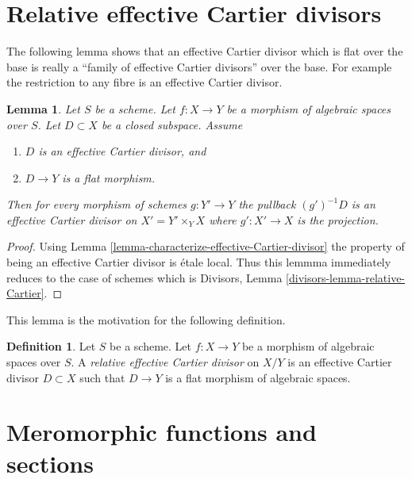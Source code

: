 \documentclass{stacks-project}
\theoremstyle{plain}
\newtheorem{lemma}[subsection]{Lemma}
\theoremstyle{definition}
\newtheorem{definition}[subsection]{Definition}
\theoremstyle{remark}
\numberwithin{equation}{subsection}
\begin{document}
\section{Relative effective Cartier divisors}
\label{section-effective-Cartier-morphisms}

\noindent
The following lemma shows that an effective Cartier divisor which is
flat over the base is really a ``family of effective Cartier divisors''
over the base. For example the restriction to any fibre is an effective
Cartier divisor.

\begin{lemma}
\label{lemma-relative-Cartier}
Let $S$ be a scheme. Let $f : X \to Y$ be a morphism of
algebraic spaces over $S$. Let $D \subset X$ be a closed subspace.
Assume
\begin{enumerate}
\item $D$ is an effective Cartier divisor, and
\item $D \to Y$ is a flat morphism.
\end{enumerate}
Then for every morphism of schemes $g : Y' \to Y$ the pullback
$(g')^{-1}D$ is an effective Cartier divisor on $X' = Y' \times_Y X$
where $g' : X' \to X$ is the projection.
\end{lemma}

\begin{proof}
Using Lemma \ref{lemma-characterize-effective-Cartier-divisor}
the property of being an effective Cartier divisor is \'etale local.
Thus this lemmma immediately reduces to the case of schemes
which is Divisors, Lemma \ref{divisors-lemma-relative-Cartier}.
\end{proof}

\noindent
This lemma is the motivation for the following definition.

\begin{definition}
\label{definition-relative-effective-Cartier-divisor}
Let $S$ be a scheme.
Let $f : X \to Y$ be a morphism of algebraic spaces over $S$.
A {\it relative effective Cartier divisor} on $X/Y$ is an
effective Cartier divisor $D \subset X$ such that $D \to Y$
is a flat morphism of algebraic spaces.
\end{definition}








\section{Meromorphic functions and sections}
\label{section-meromorphic-functions}
\end{document}
